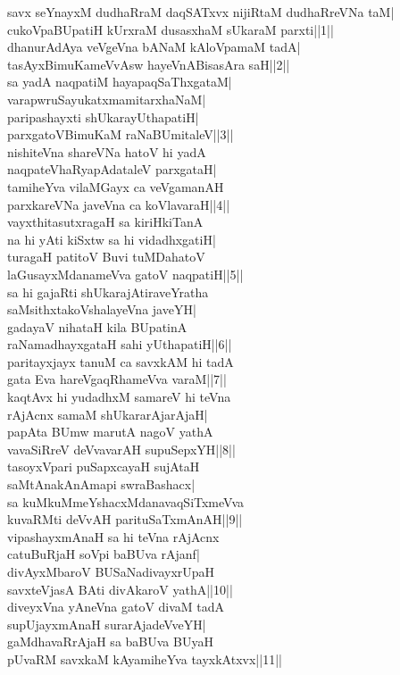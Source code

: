 \documentclass{article}
\begin{document}
savx seYnayxM dudhaRraM daqSATxvx nijiRtaM dudhaRreVNa taM|\\
cukoVpaBUpatiH kUrxraM dusasxhaM sUkaraM parxti||1||\\
dhanurAdAya veVgeVna bANaM kAloVpamaM tadA|\\
tasAyxBimuKameVvAsw hayeVnABisasAra saH||2||\\
sa yadA naqpatiM hayapaqSaThxgataM|\\
varapwruSayukatxmamitarxhaNaM|\\
paripashayxti shUkarayUthapatiH|\\
parxgatoVBimuKaM raNaBUmitaleV||3||\\
nishiteVna shareVNa hatoV hi yadA\\
naqpateVhaRyapAdataleV parxgataH|\\
tamiheYva vilaMGayx ca veVgamanAH\\
parxkareVNa javeVna ca koVlavaraH||4||\\
vayxthitasutxragaH sa kiriHkiTanA\\
na hi yAti kiSxtw sa hi vidadhxgatiH|\\
turagaH patitoV Buvi tuMDahatoV\\
laGusayxMdanameVva gatoV naqpatiH||5||\\
sa hi gajaRti shUkarajAtiraveYratha\\
saMsithxtakoVshalayeVna javeYH|\\
gadayaV nihataH kila BUpatinA\\
raNamadhayxgataH sahi yUthapatiH||6||\\
paritayxjayx tanuM ca savxkAM hi tadA\\
gata Eva hareVgaqRhameVva varaM||7||\\
kaqtAvx hi yudadhxM samareV hi teVna\\
rAjAcnx samaM shUkararAjarAjaH|\\
papAta BUmw marutA nagoV yathA\\
vavaSiRreV deVvavarAH supuSepxYH||8||\\
tasoyxVpari puSapxcayaH sujAtaH\\
saMtAnakAnAmapi swraBashacx|\\
sa kuMkuMmeYshacxMdanavaqSiTxmeVva\\
kuvaRMti deVvAH parituSaTxmAnAH||9||\\
vipashayxmAnaH sa hi teVna rAjAcnx\\
catuBuRjaH soVpi baBUva rAjanf|\\
divAyxMbaroV BUSaNadivayxrUpaH\\
savxteVjasA BAti divAkaroV yathA||10||\\
diveyxVna yAneVna gatoV divaM tadA\\
supUjayxmAnaH surarAjadeVveYH|\\
gaMdhavaRrAjaH sa baBUva BUyaH\\
pUvaRM savxkaM kAyamiheYva tayxkAtxvx||11||
\end{document}

